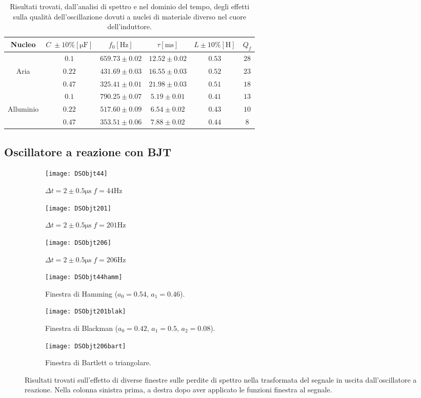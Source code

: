 \documentclass{article}[a4paper, oneside, 11pt]
\begin{document}
\begin{table}[!htb]
\begin{center}
\begin{tabular}{cc||cccc}
	\toprule
	Nucleo & $C\; \pm 10 \% [\si{\micro\F}]$ & $f_0 [\si{\Hz}]$ & $\tau [\si{\ms}]$ 
	& $L \pm 10 \% [\si{\henry}]$ & $Q_f$ \\
	\midrule
	\midrule
	 & $0.1$ & $659.73 \pm 0.02$ & $12.52 \pm 0.02$ & $0.53$ & $28$ \\
	Aria & $0.22$ &$431.69 \pm 0.03$ & $ 16.55 \pm 0.03$ & $0.52$ & $23$ \\
	 & $0.47$ & $325.41 \pm 0.01$ & $21.98 \pm 0.03$ & $0.51$ & $18$ \\ 
	\midrule
	 & $0.1$ & $790.25 \pm 0.07$ & $5.19 \pm 0.01$ & $0.41$ & $13$\\
	Alluminio & $0.22$ & $517.60 \pm 0.09$ & $6.54 \pm 0.02$ & $0.43$ & $10 $ \\
	 & $0.47$ & $353.51 \pm 0.06$ & $7.88 \pm 0.02$ & $0.44$ & $8$ \\
	\bottomrule
\end{tabular}
\caption{Risultati trovati, dall'analisi di spettro e nel dominio del tempo,
degli effetti sulla qualità dell'oscillazione dovuti a nuclei di materiale
diverso nel cuore dell'induttore. \label{tab: RLC}}
\end{center}
\end{table}

\subsection{Oscillatore a reazione con BJT}

\begin{figure}[!htb]
\centering
	\begin{subfigure}{.5\textwidth}
	\texttt{[image: DSObjt44]}
	\caption{$\Delta t = 2 \pm 0.5 \si{\us} \; f = 44 \si{\Hz}$}
	\texttt{[image: DSObjt201]}
	\caption{$\Delta t = 2 \pm 0.5 \si{\us} \; f = 201 \si{\Hz}$}
	\texttt{[image: DSObjt206]}
	\caption{$\Delta t = 2 \pm 0.5 \si{\us} \; f = 206 \si{\Hz}$}
\label{fig: BJTin}
	\end{subfigure}%
	\begin{subfigure}{.5\textwidth}
	\texttt{[image: DSObjt44hamm]}
	\caption{Finestra di Hamming ($a_0 = 0.54, \, a_1 = 0.46$).}
	\texttt{[image: DSObjt201blak]}
	\caption{Finestra di Blackman ($a_0 = 0.42, \, a_1 = 0.5, \, a_2 = 0.08$).}
	\texttt{[image: DSObjt206bart]}
	\caption{Finestra di Bartlett o triangolare.}
\label{fig: BJTwin}
	\end{subfigure}%
	\caption{Risultati trovati sull'effetto di diverse finestre	sulle
			perdite di spettro nella trasformata del segnale in uscita
		 	dall'oscillatore a reazione.
			Nella colonna sinistra prima, a destra dopo aver applicato
			le funzioni finestra al segnale. \label{fig: BJTall}}
\end{figure}
\end{document}
